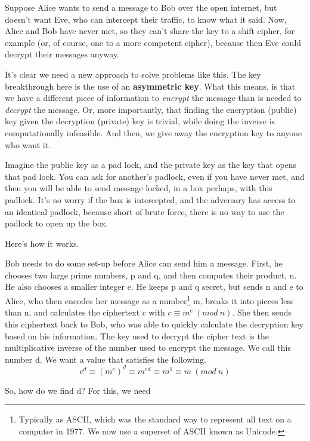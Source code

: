 \documentclass{article}
\begin{document}
        Suppose Alice wants to send a message to Bob over the open internet, but doesn't want Eve, who can intercept their traffic, to know what it said.  Now, Alice and Bob have never met, so they can't share the key to a shift cipher, for example (or, of course, one to a more competent cipher), because then Eve could decrypt their messages anyway.
     
        It's clear we need a new approach to solve problems like this.  The key breakthrough here is the use of an \textbf{asymmetric key}.  
        What this means, is that we have a different piece of information to \textit{encrypt} the message than is needed to \textit{decrypt} the message.  
        Or, more importantly, that finding the encryption (public) key given the decryption (private) key is trivial, while doing the inverse is computationally infeasible.  
        And then, we give away the encryption key to anyone who want it.
     
        Imagine the public key as a pad lock, and the private key as the key that opens that pad lock.  You can ask for another's padlock, even if you have never met, and then you will be able to send message locked, in a box perhaps, with this padlock.  It's no worry if the box is intercepted, and the adversary has access to an identical padlock, because short of brute force, there is no way to use the padlock to open up the box.
     
        Here's how it works.
        
        Bob needs to do some set-up before Alice can send him a message.  First, he chooses two large prime numbers, p and q, and then computes their product, n.  He also chooses a smaller integer e.  
        He keeps p and q secret, but sends n and e to Alice, who then encodes her message as a 
        number\footnote{Typically as ASCII, which was the standard way to represent all text on a computer in 1977.  We now use a superset of ASCII known as Unicode.} 
        m, breaks it into pieces less than n, and calculates the ciphertext c with $c\equiv m^{e}\ (mod\ n)$.  
        She then sends this ciphertext back to Bob, who was able to quickly calculate the decryption key based on his information.  
        The key used to decrypt the cipher text is the multiplicative inverse of the number used to encrypt the message.  We call this number d.  We want a value that satisfies the following.
        $$c^{d}\equiv (m^{e})^{d}\equiv m^{ed} \equiv m^1 \equiv m\ (mod\ n)$$
        
        So, how do we find d?  For this, we need 
	        
        
\end{document}
